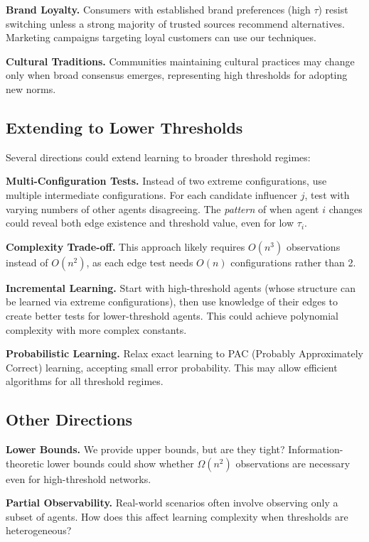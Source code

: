 \documentclass[conference]{IEEEtran}
\begin{document}
\textbf{Brand Loyalty.} Consumers with established brand preferences (high $\tau$) resist switching unless a strong majority of trusted sources recommend alternatives. Marketing campaigns targeting loyal customers can use our techniques.

\textbf{Cultural Traditions.} Communities maintaining cultural practices may change only when broad consensus emerges, representing high thresholds for adopting new norms.

\subsection{Extending to Lower Thresholds}

Several directions could extend learning to broader threshold regimes:

\textbf{Multi-Configuration Tests.} Instead of two extreme configurations, use multiple intermediate configurations. For each candidate influencer $j$, test with varying numbers of other agents disagreeing. The \emph{pattern} of when agent $i$ changes could reveal both edge existence and threshold value, even for low $\tau_i$.

\textbf{Complexity Trade-off.} This approach likely requires $O(n^3)$ observations instead of $O(n^2)$, as each edge test needs $O(n)$ configurations rather than 2.

\textbf{Incremental Learning.} Start with high-threshold agents (whose structure can be learned via extreme configurations), then use knowledge of their edges to create better tests for lower-threshold agents. This could achieve polynomial complexity with more complex constants.

\textbf{Probabilistic Learning.} Relax exact learning to PAC (Probably Approximately Correct) learning, accepting small error probability. This may allow efficient algorithms for all threshold regimes.

\subsection{Other Directions}

\textbf{Lower Bounds.} We provide upper bounds, but are they tight? Information-theoretic lower bounds could show whether $\Omega(n^2)$ observations are necessary even for high-threshold networks.

\textbf{Partial Observability.} Real-world scenarios often involve observing only a subset of agents. How does this affect learning complexity when thresholds are heterogeneous?
\end{document}
